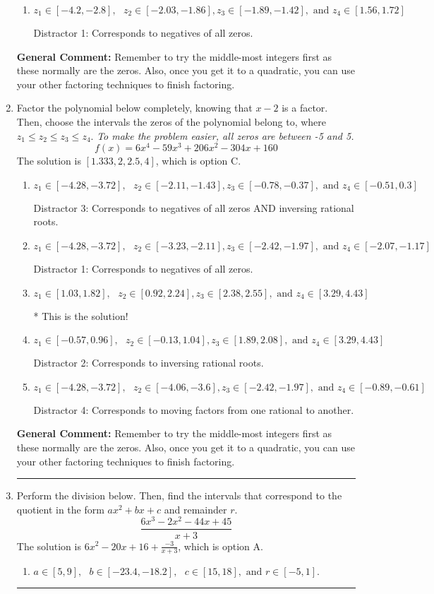 \documentclass{extbook}[14pt]
\newcommand{\litem}[1]{\item #1

\rule{\textwidth}{0.4pt}}
\begin{document}
\begin{enumerate}
{\begin{enumerate}[label=\Alph*.]
* This is the solution!
\item \( z_1 \in [-4.2, -2.8], \text{   }  z_2 \in [-2.03, -1.86], z_3 \in [-1.89, -1.42], \text{   and   } z_4 \in [1.56, 1.72] \)

 Distractor 1: Corresponds to negatives of all zeros.
\end{enumerate}

\textbf{General Comment:} Remember to try the middle-most integers first as these normally are the zeros. Also, once you get it to a quadratic, you can use your other factoring techniques to finish factoring.
}
\litem{
Factor the polynomial below completely, knowing that $x -2$ is a factor. Then, choose the intervals the zeros of the polynomial belong to, where $z_1 \leq z_2 \leq z_3 \leq z_4$. \textit{To make the problem easier, all zeros are between -5 and 5.}
\[ f(x) = 6x^{4} -59 x^{3} +206 x^{2} -304 x + 160 \]The solution is \( [1.333, 2, 2.5, 4] \), which is option C.\begin{enumerate}[label=\Alph*.]
\item \( z_1 \in [-4.28, -3.72], \text{   }  z_2 \in [-2.11, -1.43], z_3 \in [-0.78, -0.37], \text{   and   } z_4 \in [-0.51, 0.3] \)

 Distractor 3: Corresponds to negatives of all zeros AND inversing rational roots.
\item \( z_1 \in [-4.28, -3.72], \text{   }  z_2 \in [-3.23, -2.11], z_3 \in [-2.42, -1.97], \text{   and   } z_4 \in [-2.07, -1.17] \)

 Distractor 1: Corresponds to negatives of all zeros.
\item \( z_1 \in [1.03, 1.82], \text{   }  z_2 \in [0.92, 2.24], z_3 \in [2.38, 2.55], \text{   and   } z_4 \in [3.29, 4.43] \)

* This is the solution!
\item \( z_1 \in [-0.57, 0.96], \text{   }  z_2 \in [-0.13, 1.04], z_3 \in [1.89, 2.08], \text{   and   } z_4 \in [3.29, 4.43] \)

 Distractor 2: Corresponds to inversing rational roots.
\item \( z_1 \in [-4.28, -3.72], \text{   }  z_2 \in [-4.06, -3.6], z_3 \in [-2.42, -1.97], \text{   and   } z_4 \in [-0.89, -0.61] \)

 Distractor 4: Corresponds to moving factors from one rational to another.
\end{enumerate}

\textbf{General Comment:} Remember to try the middle-most integers first as these normally are the zeros. Also, once you get it to a quadratic, you can use your other factoring techniques to finish factoring.
}
\litem{
Perform the division below. Then, find the intervals that correspond to the quotient in the form $ax^2+bx+c$ and remainder $r$.
\[ \frac{6x^{3} -2 x^{2} -44 x + 45}{x + 3} \]The solution is \( 6x^{2} -20 x + 16 + \frac{-3}{x + 3} \), which is option A.\begin{enumerate}[label=\Alph*.]
\item \( a \in [5, 9], \text{   } b \in [-23.4, -18.2], \text{   } c \in [15, 18], \text{   and   } r \in [-5, 1]. \)


\end{enumerate}}
\end{enumerate}
\end{document}
